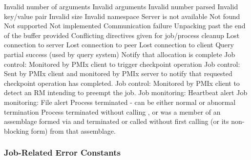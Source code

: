 \begin{constantdesc}
Invalid number of arguments
%
Invalid arguments
%
Invalid number parsed
%
Invalid key/value pair
%
Invalid size
%
Invalid namespace
%
Server is not available
%
Not found
%
Not supported
%
Not implemented
%
Communication failure
%
Unpacking past the end of the buffer provided
%
Conflicting directives given for job/process cleanup
%
Lost connection to server
%
Lost connection to peer
%
Lost connection to client
%
Query partial success (used by query system)
%
Notify that allocation is complete
%
Job control: Monitored by PMIx client to trigger checkpoint operation
%
Job control: Sent by PMIx client and monitored by PMIx server to notify that requested checkpoint operation has completed.
%
Job control: Monitored by PMIx client to detect an \ac{RM} intending to preempt the job.
%
Job monitoring: Heartbeat alert
%
Job monitoring: File alert
%
Process terminated - can be either normal or abnormal termination
%
Process terminated without calling , or was a member of an assemblage formed via  and terminated or called  without first calling  (or its non-blocking form) from that assemblage.
%
\end{constantdesc}

\subsubsection{Job-Related Error Constants}
\label{api:struct:joberrors}

